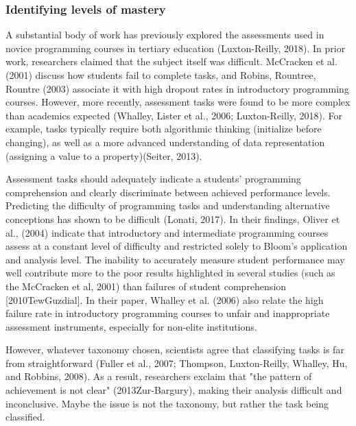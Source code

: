 \subsubsection*{Identifying levels of mastery}
A substantial body of work has previously explored the assessments used in novice programming courses in tertiary education (Luxton-Reilly, 2018). In prior work, researchers claimed that the subject itself was difficult. McCracken et al. (2001) discuss how students fail to complete tasks, and Robins, Rountree, Rountre (2003) associate it with high dropout rates in introductory programming courses.  However, more recently, assessment tasks were found to be more complex than academics expected (Whalley, Lister et al., 2006; Luxton-Reilly, 2018). For example, tasks typically require both algorithmic thinking (initialize before changing), as well as a more advanced understanding of data representation (assigning a value to a property)(Seiter, 2013).

Assessment tasks should adequately indicate a students’ programming comprehension and clearly discriminate between achieved performance levels. Predicting the difficulty of programming tasks and understanding alternative conceptions has shown to be difficult (Lonati, 2017). In their findings, Oliver et al., (2004) indicate that introductory and intermediate programming courses assess at a constant level of difficulty and restricted solely to Bloom’s application and analysis level. The inability to accurately measure student performance may well contribute more to the poor results highlighted in several studies (such as the McCracken et al, 2001) than failures of student comprehension [2010TewGuzdial].  In their paper, Whalley et al. (2006) also relate the high failure rate in introductory programming courses to unfair and inappropriate assessment instruments, especially for non-elite institutions.




However, whatever taxonomy chosen, scientists agree that classifying tasks is far from straightforward (Fuller et al., 2007; Thompson, Luxton-Reilly, Whalley, Hu, and Robbins, 2008). As a result, researchers exclaim that "the pattern of achievement is not clear" (2013Zur-Bargury), making their analysis difficult and inconclusive. Maybe the issue is not the taxonomy, but rather the task being classified.

